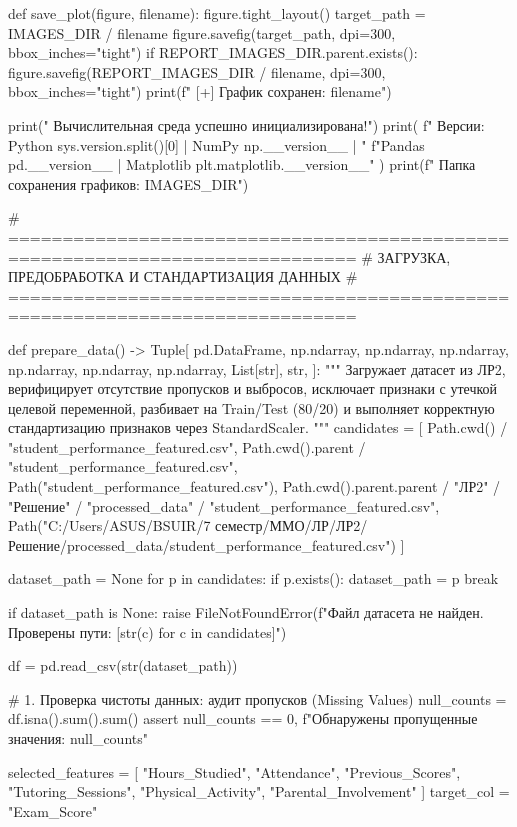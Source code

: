 \documentclass[14pt,a4paper]{extarticle}
\begin{document}
\begin{CodeListing}
def save_plot(figure, filename):
    figure.tight_layout()
    target_path = IMAGES_DIR / filename
    figure.savefig(target_path, dpi=300, bbox_inches="tight")
    if REPORT_IMAGES_DIR.parent.exists():
        figure.savefig(REPORT_IMAGES_DIR / filename, dpi=300, bbox_inches="tight")
    print(f"  [+] График сохранен: {filename}")


print(" Вычислительная среда успешно инициализирована!")
print(
    f" Версии: Python {sys.version.split()[0]} | NumPy {np.__version__} | "
    f"Pandas {pd.__version__} | Matplotlib {plt.matplotlib.__version__}"
)
print(f" Папка сохранения графиков: {IMAGES_DIR}")

# ==============================================================================
# ЗАГРУЗКА, ПРЕДОБРАБОТКА И СТАНДАРТИЗАЦИЯ ДАННЫХ
# ==============================================================================

def prepare_data() -> Tuple[
    pd.DataFrame, np.ndarray, np.ndarray, np.ndarray, np.ndarray,
    np.ndarray, np.ndarray, List[str], str,
]:
    """
    Загружает датасет из ЛР2, верифицирует отсутствие пропусков и выбросов,
    исключает признаки с утечкой целевой переменной, разбивает на Train/Test (80/20)
    и выполняет корректную стандартизацию признаков через StandardScaler.
    """
    candidates = [
        Path.cwd() / "student_performance_featured.csv",
        Path.cwd().parent / "student_performance_featured.csv",
        Path("student_performance_featured.csv"),
        Path.cwd().parent.parent / "ЛР2" / "Решение" / "processed_data" / "student_performance_featured.csv",
        Path("C:/Users/ASUS/BSUIR/7 семестр/ММО/ЛР/ЛР2/Решение/processed_data/student_performance_featured.csv")
    ]

    dataset_path = None
    for p in candidates:
        if p.exists():
            dataset_path = p
            break

    if dataset_path is None:
        raise FileNotFoundError(f"Файл датасета не найден. Проверены пути: {[str(c) for c in candidates]}")

    df = pd.read_csv(str(dataset_path))

    # 1. Проверка чистоты данных: аудит пропусков (Missing Values)
    null_counts = df.isna().sum().sum()
    assert null_counts == 0, f"Обнаружены пропущенные значения: {null_counts}"

    selected_features = [
        "Hours_Studied",
        "Attendance",
        "Previous_Scores",
        "Tutoring_Sessions",
        "Physical_Activity",
        "Parental_Involvement"
    ]
    target_col = "Exam_Score"


\end{CodeListing}
\end{document}
